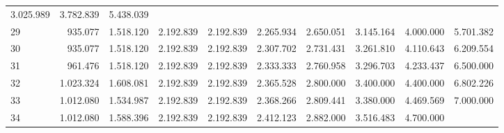 \begin{tabular}{llllllllll}
  \multicolumn{1}{r}{3.025.989} &
  \multicolumn{1}{r}{3.782.839} &
  \multicolumn{1}{r}{5.438.039} \\
\multicolumn{1}{l}{\hspace{1em}29} &
  \multicolumn{1}{|r}{935.077} &
  \multicolumn{1}{r}{1.518.120} &
  \multicolumn{1}{r}{2.192.839} &
  \multicolumn{1}{r}{2.192.839} &
  \multicolumn{1}{r}{2.265.934} &
  \multicolumn{1}{r}{2.650.051} &
  \multicolumn{1}{r}{3.145.164} &
  \multicolumn{1}{r}{4.000.000} &
  \multicolumn{1}{r}{5.701.382} \\
\multicolumn{1}{l}{\hspace{1em}30} &
  \multicolumn{1}{|r}{935.077} &
  \multicolumn{1}{r}{1.518.120} &
  \multicolumn{1}{r}{2.192.839} &
  \multicolumn{1}{r}{2.192.839} &
  \multicolumn{1}{r}{2.307.702} &
  \multicolumn{1}{r}{2.731.431} &
  \multicolumn{1}{r}{3.261.810} &
  \multicolumn{1}{r}{4.110.643} &
  \multicolumn{1}{r}{6.209.554} \\
\multicolumn{1}{l}{\hspace{1em}31} &
  \multicolumn{1}{|r}{961.476} &
  \multicolumn{1}{r}{1.518.120} &
  \multicolumn{1}{r}{2.192.839} &
  \multicolumn{1}{r}{2.192.839} &
  \multicolumn{1}{r}{2.333.333} &
  \multicolumn{1}{r}{2.760.958} &
  \multicolumn{1}{r}{3.296.703} &
  \multicolumn{1}{r}{4.233.437} &
  \multicolumn{1}{r}{6.500.000} \\
\multicolumn{1}{l}{\hspace{1em}32} &
  \multicolumn{1}{|r}{1.023.324} &
  \multicolumn{1}{r}{1.608.081} &
  \multicolumn{1}{r}{2.192.839} &
  \multicolumn{1}{r}{2.192.839} &
  \multicolumn{1}{r}{2.365.528} &
  \multicolumn{1}{r}{2.800.000} &
  \multicolumn{1}{r}{3.400.000} &
  \multicolumn{1}{r}{4.400.000} &
  \multicolumn{1}{r}{6.802.226} \\
\multicolumn{1}{l}{\hspace{1em}33} &
  \multicolumn{1}{|r}{1.012.080} &
  \multicolumn{1}{r}{1.534.987} &
  \multicolumn{1}{r}{2.192.839} &
  \multicolumn{1}{r}{2.192.839} &
  \multicolumn{1}{r}{2.368.266} &
  \multicolumn{1}{r}{2.809.441} &
  \multicolumn{1}{r}{3.380.000} &
  \multicolumn{1}{r}{4.469.569} &
  \multicolumn{1}{r}{7.000.000} \\
\multicolumn{1}{l}{\hspace{1em}34} &
  \multicolumn{1}{|r}{1.012.080} &
  \multicolumn{1}{r}{1.588.396} &
  \multicolumn{1}{r}{2.192.839} &
  \multicolumn{1}{r}{2.192.839} &
  \multicolumn{1}{r}{2.412.123} &
  \multicolumn{1}{r}{2.882.000} &
  \multicolumn{1}{r}{3.516.483} &
  \multicolumn{1}{r}{4.700.000} &

\end{tabular}
